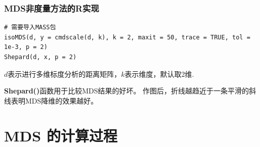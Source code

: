 \documentclass[UTF8, compress]{ctexbeamer}
\begin{document}
	\begin{frame}[fragile]
	\frametitle{{\sffamily MDS}{\heiti 非度量方法的}{\sffamily R}{\heiti 实现}}
	
	\pause 
	
\begin{lstlisting}[style=A]
# 需要导入MASS包
isoMDS(d, y = cmdscale(d, k), k = 2, maxit = 50, trace = TRUE, tol = 1e-3, p = 2)
Shepard(d, x, p = 2)
\end{lstlisting}

	\pause 
	\vspace{.3cm}
	
	$d$表示进行多维标度分析的距离矩阵，$k$表示维度，默认取$2$维.
	
	\vspace{.3cm}
	
	\pause
	
	\textbf{Shepard()}函数用于比较MDS结果的好坏。
	作图后，折线越趋近于一条平滑的斜线表明MDS降维的效果越好。
	

	\end{frame}

	
\section{{\sffamily MDS} {\heiti 的计算过程}}

	\frame{\tableofcontents[currentsection]}
	
\end{document}
